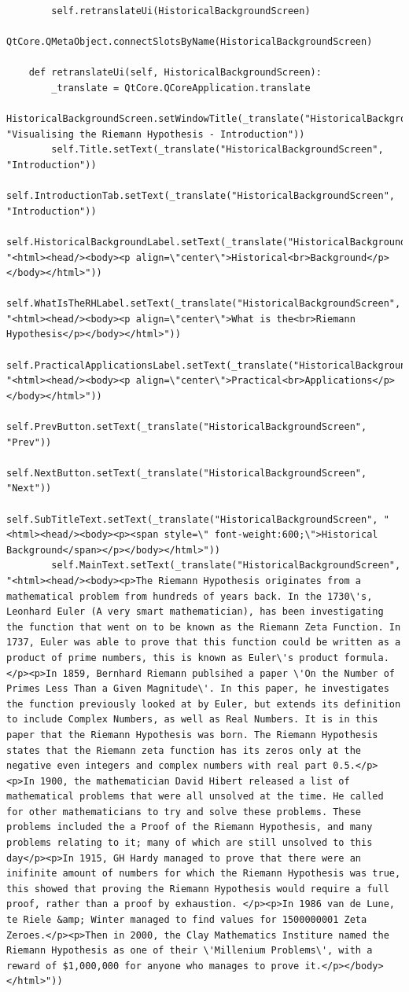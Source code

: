 \documentclass{article}
\begin{document}
\begin{lstlisting}
        self.retranslateUi(HistoricalBackgroundScreen)
        QtCore.QMetaObject.connectSlotsByName(HistoricalBackgroundScreen)

    def retranslateUi(self, HistoricalBackgroundScreen):
        _translate = QtCore.QCoreApplication.translate
        HistoricalBackgroundScreen.setWindowTitle(_translate("HistoricalBackgroundScreen", "Visualising the Riemann Hypothesis - Introduction"))
        self.Title.setText(_translate("HistoricalBackgroundScreen", "Introduction"))
        self.IntroductionTab.setText(_translate("HistoricalBackgroundScreen", "Introduction"))
        self.HistoricalBackgroundLabel.setText(_translate("HistoricalBackgroundScreen", "<html><head/><body><p align=\"center\">Historical<br>Background</p></body></html>"))
        self.WhatIsTheRHLabel.setText(_translate("HistoricalBackgroundScreen", "<html><head/><body><p align=\"center\">What is the<br>Riemann Hypothesis</p></body></html>"))
        self.PracticalApplicationsLabel.setText(_translate("HistoricalBackgroundScreen", "<html><head/><body><p align=\"center\">Practical<br>Applications</p></body></html>"))
        self.PrevButton.setText(_translate("HistoricalBackgroundScreen", "Prev"))
        self.NextButton.setText(_translate("HistoricalBackgroundScreen", "Next"))
        self.SubTitleText.setText(_translate("HistoricalBackgroundScreen", "<html><head/><body><p><span style=\" font-weight:600;\">Historical Background</span></p></body></html>"))
        self.MainText.setText(_translate("HistoricalBackgroundScreen", "<html><head/><body><p>The Riemann Hypothesis originates from a mathematical problem from hundreds of years back. In the 1730\'s, Leonhard Euler (A very smart mathematician), has been investigating the function that went on to be known as the Riemann Zeta Function. In 1737, Euler was able to prove that this function could be written as a product of prime numbers, this is known as Euler\'s product formula.</p><p>In 1859, Bernhard Riemann publsihed a paper \'On the Number of Primes Less Than a Given Magnitude\'. In this paper, he investigates the function previously looked at by Euler, but extends its definition to include Complex Numbers, as well as Real Numbers. It is in this paper that the Riemann Hypothesis was born. The Riemann Hypothesis states that the Riemann zeta function has its zeros only at the negative even integers and complex numbers with real part 0.5.</p><p>In 1900, the mathematician David Hibert released a list of mathematical problems that were all unsolved at the time. He called for other mathematicians to try and solve these problems. These problems included the a Proof of the Riemann Hypothesis, and many problems relating to it; many of which are still unsolved to this day</p><p>In 1915, GH Hardy managed to prove that there were an inifinite amount of numbers for which the Riemann Hypothesis was true, this showed that proving the Riemann Hypothesis would require a full proof, rather than a proof by exhaustion. </p><p>In 1986 van de Lune, te Riele &amp; Winter managed to find values for 1500000001 Zeta Zeroes.</p><p>Then in 2000, the Clay Mathematics Institure named the Riemann Hypothesis as one of their \'Millenium Problems\', with a reward of $1,000,000 for anyone who manages to prove it.</p></body></html>"))

\end{lstlisting}
\end{document}
